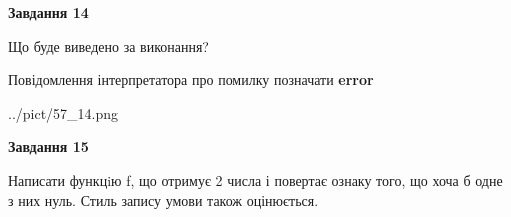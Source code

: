 \documentclass[11pt, ukrainian]{article}
\begin{document}
{\begin {large}
{\begin {center}\textbf{Завдання 14}\end {center}}\par
Що буде виведено за виконання? \par
Повідомлення інтерпретатора про помилку позначати \textbf{error}

\begin{center}
	{../pict/57_14.png}
\end{center}
\newpage

{\begin {center}\textbf{Завдання 15}\end {center}}\par

Написати функцiю f, що отримує 2 числа і повертає ознаку того, що хоча б одне з них нуль. Стиль запису умови також оцінюється.\par
\newpage

\end {large}}
\end{document}
